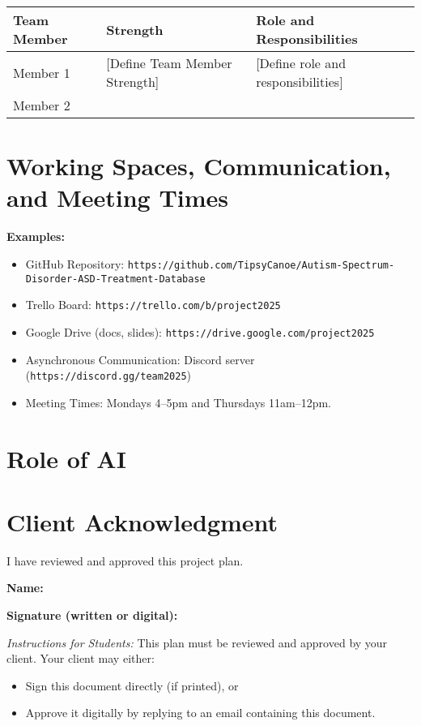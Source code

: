 \documentclass{article}
\begin{document}
\begin{tabularx}{\textwidth}{|X|X|X|}
    \hline
    \textbf{Team Member} & \textbf{Strength} & \textbf{Role and Responsibilities} \\
    \hline
    Member 1 & [Define Team Member Strength] & [Define role and responsibilities] \\
    \hline
    Member 2 & & \\
    \hline
\end{tabularx}

\section*{Working Spaces, Communication, and Meeting Times}
\textbf{Examples:}  
\begin{itemize}
    \item GitHub Repository: \texttt{https://github.com/TipsyCanoe/Autism-Spectrum-Disorder-ASD-Treatment-Database}  
    \item Trello Board: \texttt{https://trello.com/b/project2025}  
    \item Google Drive (docs, slides): \texttt{https://drive.google.com/project2025}  
    \item Asynchronous Communication: Discord server (\texttt{https://discord.gg/team2025})
    \item Meeting Times: Mondays 4--5pm and Thursdays 11am--12pm.  
\end{itemize}

\section*{Role of AI}

\section*{Client Acknowledgment}
I have reviewed and approved this project plan.  

\vspace{1em}
\noindent\textbf{Name:} \underline{\hspace{7cm}}  

\vspace{1em}
\noindent\textbf{Signature (written or digital):} \underline{\hspace{7cm}}  

\vspace{2em}
\noindent\textit{Instructions for Students:}  
This plan must be reviewed and approved by your client.  
Your client may either:  
\begin{itemize}
    \item Sign this document directly (if printed), or  
    \item Approve it digitally by replying to an email containing this document.  
\end{itemize}
\end{document}
